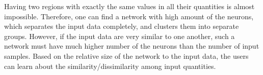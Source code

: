Having two regions with exactly the same values in all their quantities is almost impossible. 
Therefore, one can find a network with high amount of the neurons, which separates the input data completely, and clusters them into separate groups.
However, if the input data are very similar to one another, such a network must have much higher number of the neurons than the number of input samples. 
Based on the relative size of the network to the input data, the users can learn about the similarity/dissimilarity among input quantities.

